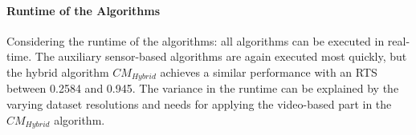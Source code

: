 \paragraph{Runtime of the Algorithms}
Considering the runtime of the algorithms: all algorithms can be executed in real-time.
The auxiliary sensor-based algorithms are again executed most quickly, but the hybrid algorithm $CM_{Hybrid}$ achieves a similar performance with an RTS between 0.2584 and 0.945.
The variance in the runtime can be explained by the varying dataset resolutions and needs for applying the video-based part in the $CM_{Hybrid}$ algorithm.